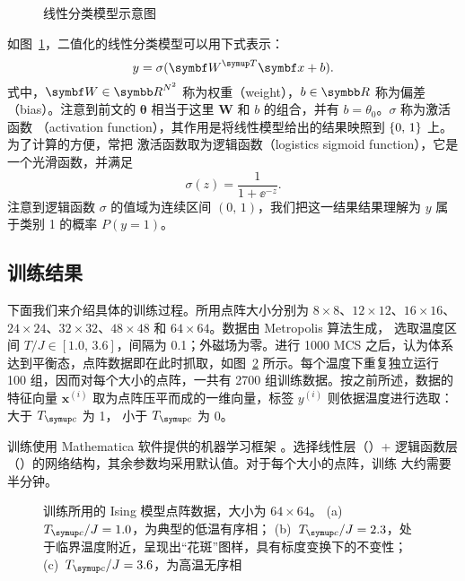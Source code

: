\begin{figure}[htb]
  \centering
  \caption{线性分类模型示意图}
  \label{fig:linear-layer}
\end{figure}

如图~\ref{fig:linear-layer}，二值化的线性分类模型可以用下式表示：
\begin{equation}
  y = \sigma(\bm{W}^\trans \bm{x} + b).
\end{equation}
式中，$\bm{W}\in\R^{N^2}$ 称为权重（weight），$b\in\R$ 称为偏差（bias）。注意到前文的
$\bm{\theta}$ 相当于这里 $\bm{W}$ 和 $b$ 的组合，并有 $b=\theta_0$。$\sigma$ 称为激活函数
（activation function），其作用是将线性模型给出的结果映照到 ${\{0,\,1\}}$ 上。为了计算的方便，常把
激活函数取为逻辑函数（logistics sigmoid function），它是一个光滑函数，并满足
\begin{equation}
  \sigma(z) = \frac{1}{1+\ee^{-z}}.
\end{equation}
注意到逻辑函数 $\sigma$ 的值域为连续区间 $(0,\,1)$，我们把这一结果结果理解为 $y$ 属于类别 1
的概率 $P(y=1)$。

\subsection{训练结果}
\label{subsec:ising-linear-train-result}

下面我们来介绍具体的训练过程。所用点阵大小分别为 $8 \times 8$、$12 \times 12$、$16 \times 16$、
$24 \times 24$、$32 \times 32$、$48 \times 48$ 和 $64 \times 64$。数据由 Metropolis 算法生成，
选取温度区间 $T/J \in [1.0,\,3.6]$，间隔为 0.1；外磁场为零。进行 \num{1000} MCS 之后，认为体系
达到平衡态，点阵数据即在此时抓取，如图~\ref{fig:ising-lattice} 所示。每个温度下重复独立运行
\num{100} 组，因而对每个大小的点阵，一共有 \num{2700} 组训练数据。按之前所述，数据的特征向量
$\bm{x}^{(i)}$ 取为点阵压平而成的一维向量，标签 $y^{(i)}$ 则依据温度进行选取：大于 $\Tc$ 为 1，
小于 $\Tc$ 为 0。

训练使用 Mathematica 软件提供的机器学习框架 \cite{nettrain}。选择线性层（）+
逻辑函数层（）的网络结构，其余参数均采用默认值。对于每个大小的点阵，训练
大约需要半分钟。

\begin{figure}[htb]
  \centering
  \begin{subfigure}[b]{0.3\textwidth}
    \centering
    \caption{}
  \end{subfigure}
  \begin{subfigure}[b]{0.3\textwidth}
    \centering
    \caption{}
  \end{subfigure}
  \begin{subfigure}[b]{0.3\textwidth}
    \centering
    \caption{}
  \end{subfigure}
  \caption{训练所用的 Ising 模型点阵数据，大小为 $64 \times 64$。
    (a)~$\Tc/J=1.0$，为典型的低温有序相；
    (b)~$\Tc/J=2.3$，处于临界温度附近，呈现出“花斑”图样，具有标度变换下的不变性；
    (c)~$\Tc/J=3.6$，为高温无序相}
  \label{fig:ising-lattice}
\end{figure}

